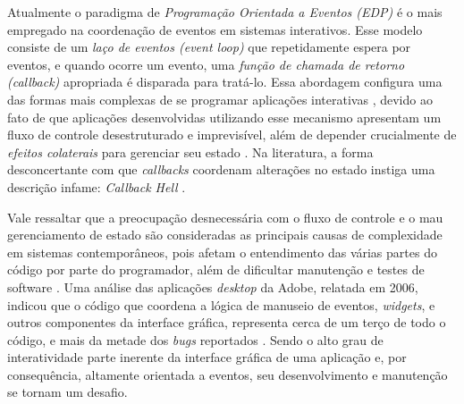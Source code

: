 Atualmente o paradigma de \emph{Programação Orientada a Eventos
(EDP)} é o mais empregado na
coordenação de eventos em sistemas interativos.
Esse modelo consiste de um \emph{laço de eventos (event loop)}
que repetidamente espera por eventos, e quando ocorre um
evento, uma \emph{função de chamada de retorno (callback)}
apropriada é disparada para tratá-lo.
Essa abordagem configura uma das formas mais complexas de se
programar aplicações interativas \cite{
  edwards2009coherent,
  fischer2007tasks,
  maier2010deprecating,
  reppy1992higher},
devido ao fato de que aplicações desenvolvidas utilizando
esse mecanismo apresentam um fluxo de controle desestruturado
e imprevisível, além de depender crucialmente de
\emph{efeitos colaterais\footnotemark} para
gerenciar seu estado \cite{
  meyerovich2009flapjax,
  muller2015interactive,
  muller2015practical}.
Na literatura, a forma desconcertante com que \emph{callbacks}
coordenam alterações no estado instiga uma descrição infame:
\emph{Callback Hell} \cite[p.~2]{edwards2009coherent}.

Vale ressaltar que a preocupação desnecessária com o
fluxo de controle e o mau gerenciamento de estado são
consideradas as principais causas de complexidade em
sistemas contemporâneos, pois afetam o entendimento das
várias partes do código por parte do programador,
além de dificultar manutenção e testes de software
\cite{moseley06out}.
Uma análise das aplicações \emph{desktop} da Adobe,
relatada em 2006, indicou que o código que coordena a
lógica de manuseio de eventos, \emph{widgets}, e outros
componentes da interface gráfica, representa cerca de
um terço de todo o código, e mais da metade dos \emph{bugs}
reportados \cite{jarvi2008property}.
Sendo o alto grau de interatividade parte inerente da
interface gráfica de uma aplicação e, por consequência,
altamente orientada a eventos, seu desenvolvimento e
manutenção se tornam um desafio.

